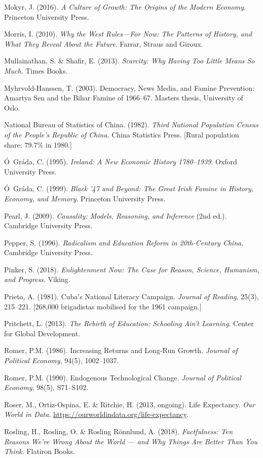 Mokyr, J. (2016). \emph{A Culture of Growth: The Origins of the Modern
Economy}. Princeton University Press.

Morris, I. (2010). \emph{Why the West Rules---For Now: The Patterns of History, and What They Reveal About the Future}. Farrar, Straus and Giroux.

Mullainathan, S. \& Shafir, E. (2013). \emph{Scarcity: Why Having Too
Little Means So Much}. Times Books.

Myhrvold-Hanssen, T. (2003). Democracy, News Media, and Famine
Prevention: Amartya Sen and the Bihar Famine of 1966--67. Masters thesis,
University of Oslo.

National Bureau of Statistics of China. (1982). \emph{Third National
Population Census of the People's Republic of China}. China Statistics
Press. {[}Rural population share: 79.7\% in 1980.{]}

Ó~Gráda, C. (1995). \emph{Ireland: A New Economic History
1780--1939}. Oxford University Press.

Ó~Gráda, C. (1999). \emph{Black '47 and Beyond: The Great Irish
Famine in History, Economy, and Memory}. Princeton University Press.

Pearl, J. (2009). \emph{Causality: Models, Reasoning, and Inference}
(2nd ed.). Cambridge University Press.

Pepper, S. (1996). \emph{Radicalism and Education Reform in 20th-Century
China}. Cambridge University Press.

Pinker, S. (2018). \emph{Enlightenment Now: The Case for Reason, Science, Humanism, and Progress}. Viking.

Prieto, A. (1981). Cuba's National Literacy Campaign. \emph{Journal of
Reading}, 25(3), 215--221. {[}268,000 brigadistas mobilised for the 1961
campaign.{]}

Pritchett, L. (2013). \emph{The Rebirth of Education: Schooling Ain't
Learning}. Center for Global Development.

Romer, P.M. (1986). Increasing Returns and Long-Run Growth.
\emph{Journal of Political Economy}, 94(5), 1002--1037.

Romer, P.M. (1990). Endogenous Technological Change. \emph{Journal of
Political Economy}, 98(5), S71--S102.

Roser, M., Ortiz-Ospina, E. \& Ritchie, H. (2013, ongoing). Life
Expectancy. \emph{Our World in Data}.
\url{https://ourworldindata.org/life-expectancy}.

Rosling, H., Rosling, O. \& Rosling R\"{o}nnlund, A. (2018).
\emph{Factfulness: Ten Reasons We're Wrong About the World --- and
Why Things Are Better Than You Think}. Flatiron Books.

